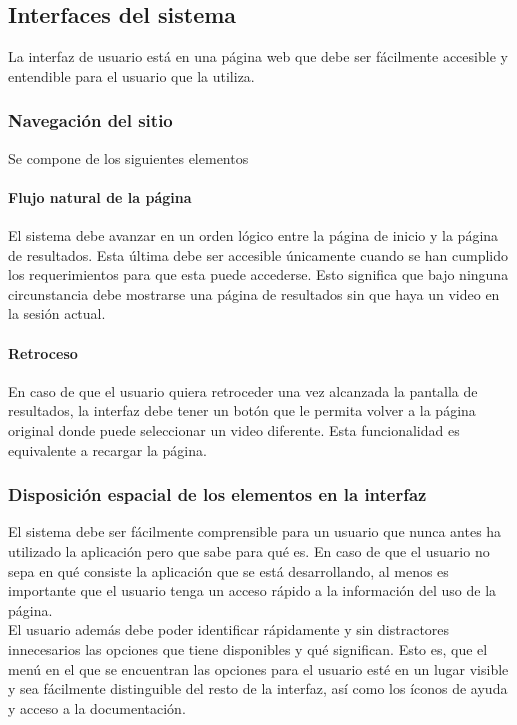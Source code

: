 \documentclass[a4paper]{article}
\begin{document}
{\color{Blue}
\subsection{Interfaces del sistema}
\color{black}
\justify 
	
    La interfaz de usuario está en una página web que debe ser fácilmente accesible y entendible para el usuario que la utiliza. 
    
	\subsubsection{Navegación del sitio}
    	Se compone de los siguientes elementos 
        \paragraph{Flujo natural de la página}
        	El sistema debe avanzar en un orden lógico entre la página de inicio y la página de resultados. Esta última debe ser accesible únicamente cuando se han cumplido los requerimientos para que esta puede accederse. Esto significa que bajo ninguna circunstancia debe mostrarse una página de resultados sin que haya un video en la sesión actual. 
        \paragraph{Retroceso}
            En caso de que el usuario quiera retroceder una vez alcanzada la pantalla de resultados, la interfaz debe tener un botón que le permita volver a la página original donde puede seleccionar un video diferente. Esta funcionalidad es equivalente a recargar la página. 
     
     \subsubsection{Disposición espacial de los elementos en la interfaz}
     	El sistema debe ser fácilmente comprensible para un usuario que nunca antes ha utilizado la aplicación pero que sabe para qué es. En caso de que el usuario no sepa en qué consiste la aplicación que se está desarrollando, al menos es importante que el usuario tenga un acceso rápido a la información del uso de la página. \\
        
        El usuario además debe poder identificar rápidamente y sin distractores innecesarios las opciones que tiene disponibles y qué significan. Esto es, que el menú en el que se encuentran las opciones para el usuario esté en un lugar visible y sea fácilmente distinguible del resto de la interfaz, así como los íconos de ayuda y acceso a la documentación. \\ \\ 

}
\end{document}
